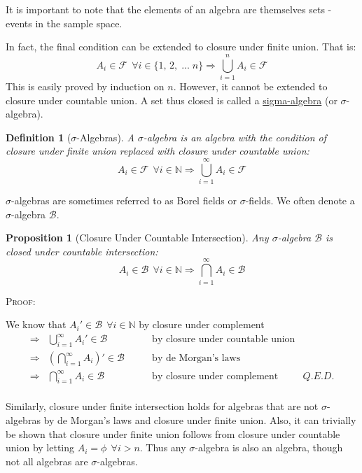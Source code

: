\documentclass[12pt,a4paper]{article}
\newtheorem{defn}[thm]{Definition}
\newtheorem{prop}[thm]{Proposition}
\begin{document}
\noindent It is important to note that the elements of an algebra are themselves sets - events in the sample space.\par
\vspace{12pt}

\noindent In fact, the final condition can be extended to closure under finite union. That is:
$$A_i \in\mathcal{F}\:\:\forall i\in\{1,\,2,\;...\;n\}\Rightarrow\bigcup_{i=1}^{n}A_i\in\mathcal{F}$$
This is easily proved by induction on $n$. However, it cannot be extended to closure under countable union. A set thus closed is called a \underline{sigma-algebra} (or $\sigma$-algebra).

\begin{defn}[$\sigma$-Algebras]

A $\sigma$-algebra is an algebra with the condition of closure under finite union replaced with closure under countable union:
$$A_i\in\mathcal{F}\:\:\forall i\in\mathbb{N}\Rightarrow\bigcup_{i=1}^{\infty}A_i\in\mathcal{F}$$\end{defn}

\noindent $\sigma$-algebras are sometimes referred to as Borel fields or $\sigma$-fields. We often denote a $\sigma$-algebra $\mathcal{B}$.

\begin{prop}[Closure Under Countable Intersection]

Any $\sigma$-algebra $\mathcal{B}$ is closed under countable intersection:
$$A_i\in\mathcal{B}\:\:\forall i\in\mathbb{N}\Rightarrow\bigcap_{i=1}^{\infty}A_i\in\mathcal{B}$$\end{prop}

\noindent \textsc{Proof:}\par
\vspace{12pt}
\indent We know that $A_i'\in\mathcal{B}\:\:\forall i\in\mathbb{N}$ by closure under complement
$$\begin{array}{cllr}
\Rightarrow& \bigcup\limits_{i=1}^{\infty}A_i'\in\mathcal{B}\qquad &\text{by closure under countable union}&\\
\Rightarrow& \left(\bigcap\limits_{i=1}^{\infty}A_i\right)'\in\mathcal{B}\qquad &\text{by de Morgan's laws}&\\
\Rightarrow& \bigcap\limits_{i=1}^{\infty}A_i\in\mathcal{B}\qquad &\text{by closure under complement}&Q.E.D.\\
\end{array}$$

Similarly, closure under finite intersection holds for algebras that are not $\sigma$-algebras by de Morgan's laws and closure under finite union. Also, it can trivially be shown that closure under finite union follows from closure under countable union by letting $A_i=\phi\:\:\forall i>n$. Thus any $\sigma$-algebra is also an algebra, though not all algebras are $\sigma$-algebras.
\end{document}
